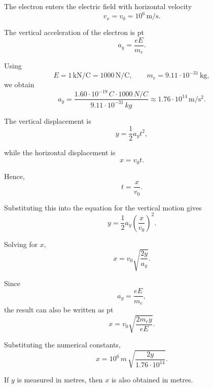 \documentclass[t,aspectratio=169]{beamer}
\begin{document}
\begin{frame}
\begin{itemize}
\begin{enumerate}
\begin{center}
\begin{figure}[h]
\end{figure}
\end{center}

\pagebreak
The electron enters the electric field with horizontal velocity
$$ v_x = v_0 = 10^6\,\mathrm{m/s}. $$

The vertical acceleration of the electron is
 pt
$$ a_y = \frac{eE}{m_e}. $$

Using
$$ E = 1\,\mathrm{kN/C} = 1000\,\mathrm{N/C}, \qquad m_e = 9.11 \cdot 10^{-31}\,\mathrm{kg}, $$
we obtain
$$ a_y = \frac{1.60 \cdot 10^{-19}\,C \cdot 1000\,N/C} {9.11 \cdot 10^{-31}\,kg} \approx 1.76 \cdot 10^{14}\,\mathrm{m/s^2}. $$

The vertical displacement is
$$ y = \frac{1}{2}a_y t^2, $$

\pagebreak
while the horizontal displacement is
$$ x = v_0 t. $$

Hence,
$$ t = \frac{x}{v_0}. $$

Substituting this into the equation for the vertical motion gives
$$ y = \frac{1}{2}a_y \left(\frac{x}{v_0}\right)^2.$$

Solving for \(x\),
$$ x = v_0 \sqrt{\frac{2y}{a_y}}. $$

\pagebreak
Since
$$ a_y = \frac{eE}{m_e}, $$
the result can also be written as
 pt
$$ \boxed{x = v_0 \sqrt{\frac{2m_e y}{eE}} }.$$

Substituting the numerical constants,
$$ \boxed{ x = 10^6\,m\,\sqrt{\frac{2y}{1.76 \cdot 10^{14}} }}.$$

If \(y\) is measured in metres, then \(x\) is also obtained in metres.



\end{enumerate}
\end{itemize}
\end{frame}
\end{document}
